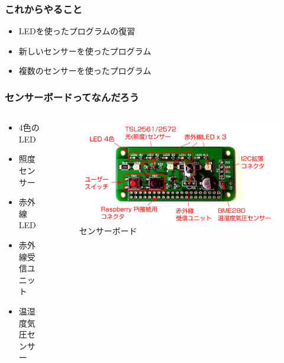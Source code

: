 \begin{frame}
  \frametitle{これからやること}
  \begin{itemize}
    \item LEDを使ったプログラムの復習
    \item 新しいセンサーを使ったプログラム
    \item 複数のセンサーを使ったプログラム
  \end{itemize}
\end{frame}

\begin{frame}
  \frametitle{センサーボードってなんだろう}
  \begin{columns}
    \begin{column}{0.48\textwidth}
      \begin{itemize}
        \item 4色のLED
        \item 照度センサー
        \item 赤外線LED
        \item 赤外線受信ユニット
        \item 温湿度気圧センサー
      \end{itemize}
    \end{column}
    \begin{column}{0.48\textwidth}
      \begin{figure}
        \centering

        \includegraphics[width=1.0\textwidth]{../images/chap03/sensors_name.png}
        \caption{センサーボード}
      \end{figure}
    \end{column}
  \end{columns}
\end{frame}

